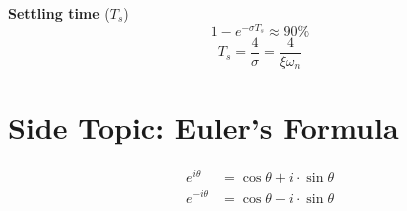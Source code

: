 \documentclass[
  letterpaper,
  DIV=11,
  numbers=noendperiod,
  oneside]{scrreprt}
\begin{document}
\textbf{Settling time} (\(T_s\)) \[1-e^{-\sigma T_s} \approx 90\%\]
\[T_s = \frac{4}{\sigma} = \frac{4}{\xi \omega_n}\]

\section*{Side Topic: Euler's Formula}\label{side-topic-eulers-formula}


\begin{align*}
    e^{i\theta} &= \cos\theta + i \cdot \sin\theta \\
    e^{-i\theta} &= \cos\theta - i \cdot \sin\theta
\end{align*}
\end{document}
